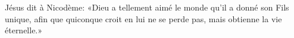 \encetemps Jésus dit à Nicodème:
	«Dieu a tellement aimé le monde qu’il a donné son Fils unique,
	afin que quiconque croit en lui ne se perde pas,
	mais obtienne la vie éternelle.»
